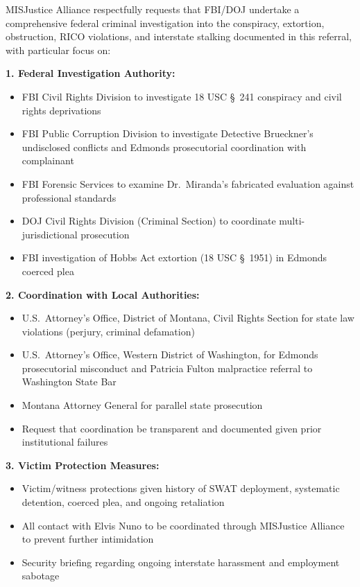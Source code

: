 \documentclass[11pt, letterpaper]{article}
\newcommand{\subsectiontitle}[1]{\vspace{0.15in}\noindent\textcolor{NavyBlue}{\textbf{#1}}\vspace{0.05in}}
\begin{document}
MISJustice Alliance respectfully requests that FBI/DOJ undertake a comprehensive federal criminal investigation into the conspiracy, extortion, obstruction, RICO violations, and interstate stalking documented in this referral, with particular focus on:

\subsectiontitle{1. Federal Investigation Authority:}
\begin{itemize}[leftmargin=*,itemsep=2pt]
    \item FBI Civil Rights Division to investigate 18 USC \S\ 241 conspiracy and civil rights deprivations
    \item FBI Public Corruption Division to investigate Detective Brueckner's undisclosed conflicts and Edmonds prosecutorial coordination with complainant
    \item FBI Forensic Services to examine Dr.\ Miranda's fabricated evaluation against professional standards
    \item DOJ Civil Rights Division (Criminal Section) to coordinate multi-jurisdictional prosecution
    \item FBI investigation of Hobbs Act extortion (18 USC \S\ 1951) in Edmonds coerced plea
\end{itemize}

\subsectiontitle{2. Coordination with Local Authorities:}
\begin{itemize}[leftmargin=*,itemsep=2pt]
    \item U.S.\ Attorney's Office, District of Montana, Civil Rights Section for state law violations (perjury, criminal defamation)
    \item U.S.\ Attorney's Office, Western District of Washington, for Edmonds prosecutorial misconduct and Patricia Fulton malpractice referral to Washington State Bar
    \item Montana Attorney General for parallel state prosecution
    \item Request that coordination be transparent and documented given prior institutional failures
\end{itemize}

\subsectiontitle{3. Victim Protection Measures:}
\begin{itemize}[leftmargin=*,itemsep=2pt]
    \item Victim/witness protections given history of SWAT deployment, systematic detention, coerced plea, and ongoing retaliation
    \item All contact with Elvis Nuno to be coordinated through MISJustice Alliance to prevent further intimidation
    \item Security briefing regarding ongoing interstate harassment and employment sabotage
\end{itemize}
\end{document}

